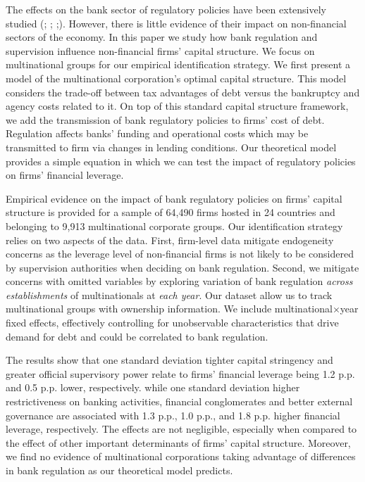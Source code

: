 \documentclass[12pt]{article}
\begin{document}
	The effects on the bank sector of regulatory policies have been extensively studied (\cite*{barth2013}; \cite*{anginer2014does};  \cite*{caprio2014macro};\cite*{demirguc2013bank}). However, there is little evidence of their impact on non-financial sectors of the economy. In this paper we study how bank regulation and supervision influence non-financial firms' capital structure. We focus on multinational groups for our empirical identification strategy. We first present a model of the multinational corporation's optimal capital structure. This model considers the trade-off between tax advantages of debt versus the bankruptcy and agency costs related to it. On top of this standard capital structure framework, we add the transmission of bank regulatory policies to firms' cost of debt. Regulation affects banks' funding and operational costs which may be transmitted to firm via changes in lending conditions. Our theoretical model provides a simple equation in which we can test the impact of regulatory policies on firms' financial leverage. 
	
	Empirical evidence on the impact of bank regulatory policies on firms' capital structure is provided for a sample of 64,490 firms hosted in 24 countries and belonging to 9,913 multinational corporate groups. Our identification strategy relies on two aspects of the data. First, firm-level data mitigate endogeneity concerns as the leverage level of non-financial firms is not likely to be considered by supervision authorities when deciding on bank regulation. Second, we mitigate concerns with omitted variables by exploring variation of bank regulation \textit{across establishments} of multinationals at \textit{each year}. Our dataset allow us to track multinational groups with ownership information. We include multinational$\times$year fixed effects, effectively controlling for unobservable characteristics that drive demand for debt and could be correlated to bank regulation. 
	
	The results show that one standard deviation tighter capital stringency and greater official supervisory power relate to firms' financial leverage being 1.2 p.p. and
	0.5 p.p. lower, respectively. while one standard deviation higher restrictiveness on banking activities, financial conglomerates and better external governance are associated with 1.3 p.p., 1.0 p.p., and 1.8 p.p. higher financial leverage, respectively. The effects are not negligible, especially when compared to the effect of other important determinants of firms' capital structure. Moreover, we find no evidence of multinational corporations taking advantage of differences in bank regulation as our theoretical model predicts. 
	
\end{document}

